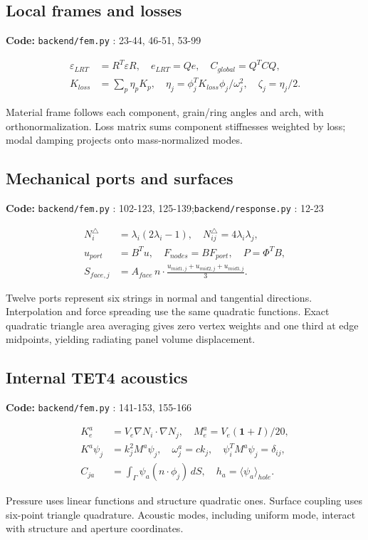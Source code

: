 \documentclass[10pt,a4paper]{article}
\newcommand{\loc}[1]{{\small\color{ink}\textbf{Code:} #1\par}}
\begin{document}
\begin{samepage}\subsection{Local frames and losses}
\loc{\texttt{backend/fem.py} : 23-44, 46-51, 53-99}
\begin{align}\varepsilon_{LRT}&=R^T\varepsilon R,\quad e_{LRT}=Qe,\quad C_{global}=Q^TCQ,\\
K_{loss}&=\sum_p\eta_p K_p,\quad\eta_j=\phi_j^TK_{loss}\phi_j/\omega_j^2,\quad\zeta_j=\eta_j/2.\end{align}

Material frame follows each component, grain/ring angles and arch, with orthonormalization. Loss matrix sums component stiffnesses weighted by loss; modal damping projects onto mass-normalized modes.\par
\end{samepage}
\begin{samepage}\subsection{Mechanical ports and surfaces}
\loc{\texttt{backend/fem.py} : 102-123, 125-139;\allowbreak\quad \texttt{backend/response.py} : 12-23}
\begin{align}N_i^\triangle&=\lambda_i(2\lambda_i-1),\quad N_{ij}^\triangle=4\lambda_i\lambda_j,\\
u_{port}&=B^Tu,\quad F_{nodes}=BF_{port},\quad P=\Phi^TB,\\
S_{face,j}&=A_{face}\,n\cdot\frac{u_{mid1,j}+u_{mid2,j}+u_{mid3,j}}3 .\end{align}

Twelve ports represent six strings in normal and tangential directions. Interpolation and force spreading use the same quadratic functions. Exact quadratic triangle area averaging gives zero vertex weights and one third at edge midpoints, yielding radiating panel volume displacement.\par
\end{samepage}
\begin{samepage}\subsection{Internal TET4 acoustics}
\loc{\texttt{backend/fem.py} : 141-153, 155-166}
\begin{align}K^a_e&=V_e\nabla N_i\cdot\nabla N_j,\quad M^a_e=V_e(\mathbf1+I)/20,\\
K^a\psi_j&=k_j^2M^a\psi_j,\quad\omega^a_j=c k_j,\quad\psi_i^TM^a\psi_j=\delta_{ij},\\
C_{ja}&=\int_{\Gamma}\psi_a(n\cdot\phi_j)\,dS,\quad h_a=\langle\psi_a\rangle_{hole}.\end{align}

Pressure uses linear functions and structure quadratic ones. Surface coupling uses six-point triangle quadrature. Acoustic modes, including uniform mode, interact with structure and aperture coordinates.\par
\end{samepage}
\end{document}
